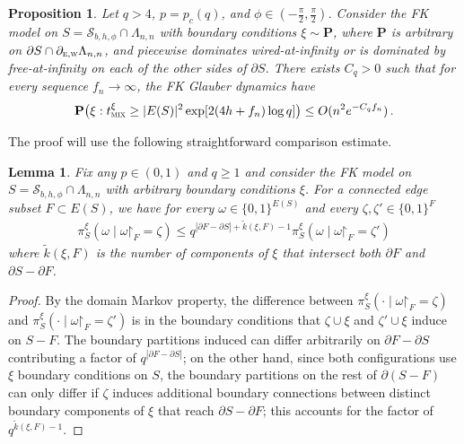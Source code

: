 \documentclass[reqno,11pt]{amsart}
\numberwithin{equation}{section}
\renewcommand{\restriction}{\mathord{\upharpoonright}}
\newtheorem{lemma}[theorem]{Lemma}
\newtheorem{proposition}[theorem]{Proposition}
\theoremstyle{definition}{
\newtheorem{example}[theorem]{Example}
\newtheorem{definition}[theorem]{Definition}
\newtheorem*{definition*}{Definition}
\newtheorem{problem}[theorem]{Problem}
\newtheorem{question}[theorem]{Question}
\newtheorem{remark}[theorem]{Remark}
}
\newcommand{\tmix}{t_{\textsc{mix}}}
\newcommand{\east}{{\textsc{e}}}
\newcommand{\west}{{\textsc{w}}}
\begin{document}
\begin{proposition}\label{prop:canonical-paths}
Let $q>4$, $p= p_c(q)$, and $\phi\in (-\frac{\pi}2, \frac{\pi}2)$. Consider the FK model on $S=\mathcal S_{b,h,\phi}\cap \Lambda_{n,n}$ with boundary conditions $\xi \sim \mathbf P$, where $\mathbf P$ is arbitrary on $\partial S \cap \partial_{\east,\west} \Lambda_{n,n}$, and piecewise dominates wired-at-infinity or is dominated by free-at-infinity on each of the other sides of $\partial S$. There exists $C_q>0$ such that for every sequence $f_n\to \infty$, the FK Glauber dynamics have 
\begin{align*}
\mathbf P\big(\xi: \tmix^{\xi} \geq |E(S)|^2\exp [2 (4h + f_n) \log q]\big)\leq O(n^2 e^{-C_q f_n})\,.
\end{align*}
\end{proposition}

The proof will use the following straightforward comparison estimate.

\begin{lemma}\label{lem:bridges-cutwidth}
Fix any $p\in (0,1)$ and $q\geq 1$ and consider the FK model on $S=\mathcal S_{b,h,\phi} \cap \Lambda_{n,n}$ with arbitrary boundary conditions $\xi$. For a connected edge subset $F\subset E(S)$, we have for every $\omega\in \{0,1\}^{E(S)}$ and every $\zeta,\zeta' \in \{0,1\}^F$
\begin{align*}
\pi^{\xi}_S(\omega \mid \omega\restriction_F= \zeta) \leq q^{|\partial F-\partial S| + \tilde k(\xi,F)-1} \pi_S^{\xi}(\omega \mid \omega\restriction_F = \zeta')
\end{align*}
where $\tilde k(\xi,F)$ is the number of components of $\xi$ that intersect both $\partial F$ and $\partial S-\partial F$.
\end{lemma}

\begin{proof} 
By the domain Markov property, the difference between $\pi_S^{\xi}(\cdot  \mid \omega\restriction_F = \zeta)$ and $\pi_S^{\xi}(\cdot \mid \omega\restriction_F = \zeta')$ is in the boundary conditions that $\zeta\cup \xi$ and $\zeta'\cup \xi$ induce on $S-F$. The boundary partitions induced can differ arbitrarily on $\partial F-\partial S$ contributing a factor of $q^{|\partial F-\partial S|}$; on the other hand, since both configurations use $\xi$ boundary conditions on $S$, the boundary partitions on the rest of $\partial (S-F)$ can only differ if $\zeta$ induces additional boundary connections between distinct boundary components of $\xi$ that reach $\partial S-\partial F$; this accounts for the factor of $q^{\tilde k(\xi,F)-1}$.   
\end{proof}
\end{document}
